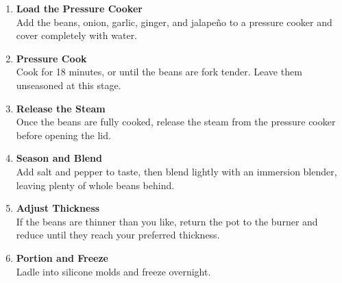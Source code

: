 \begin{enumerate}

      \item \textbf{Load the Pressure Cooker} \\
            Add the beans, onion, garlic, ginger, and jalapeño to a pressure cooker and cover completely with water.

      \item \textbf{Pressure Cook} \\
            Cook for 18 minutes, or until the beans are fork tender. Leave them unseasoned at this stage.

      \item \textbf{Release the Steam} \\
            Once the beans are fully cooked, release the steam from the pressure cooker before opening the lid.

      \item \textbf{Season and Blend} \\
            Add salt and pepper to taste, then blend lightly with an immersion blender, leaving plenty of whole beans behind.

      \item \textbf{Adjust Thickness} \\
            If the beans are thinner than you like, return the pot to the burner and reduce until they reach your preferred thickness.

      \item \textbf{Portion and Freeze} \\
            Ladle into silicone molds and freeze overnight.

\end{enumerate}


